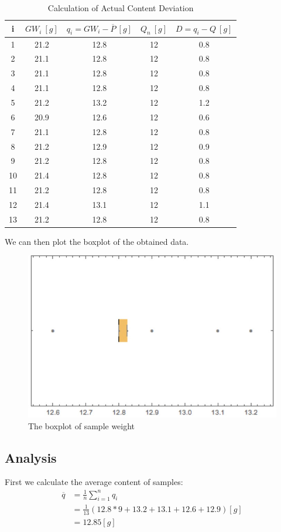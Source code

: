 \documentclass[a4paper]{article}
\begin{document}
\begin{table}[!htbp]
\centering
\begin{tabular}{|c|c|c|c|c|}
\hline
i&$GW_i\ [g]$&$q_i=GW_i-\overline{P}\ [g]$&$Q_n\ [g]$&$D=q_i-Q\ [g]$
\\\hline
1&21.2&12.8&12&0.8
\\\hline
2&21.1&12.8&12&0.8
\\\hline
3&21.1&12.8&12&0.8
\\\hline
4&21.1&12.8&12&0.8
\\\hline
5&21.2&13.2&12&1.2
\\\hline
6&20.9&12.6&12&0.6
\\\hline
7&21.1&12.8&12&0.8
\\\hline
8&21.2&12.9&12&0.9
\\\hline
9&21.2&12.8&12&0.8
\\\hline
10&21.4&12.8&12&0.8
\\\hline
11&21.2&12.8&12&0.8
\\\hline
12&21.4&13.1&12&1.1
\\\hline
13&21.2&12.8&12&0.8
\\\hline
\end{tabular}
\caption{Calculation of Actual Content Deviation} 
\end{table}

\newpage

We can then plot the boxplot of the obtained data.
\begin{figure}[!htbp]
\centering
\includegraphics[width=0.8
\linewidth,angle=0]{Boxplot.jpg}
\caption{The boxplot of sample weight}
\end{figure}

\subsection{Analysis}
First we calculate the average content of samples:
\begin{align*}
\overline{q}&=\frac{1}{n}\displaystyle\sum^n_{i=1}q_i
\\&=\frac{1}{13}(12.8*9+13.2+13.1+12.6+12.9) [g]
\\&=12.85 [g]
\end{align*}
\end{document}
